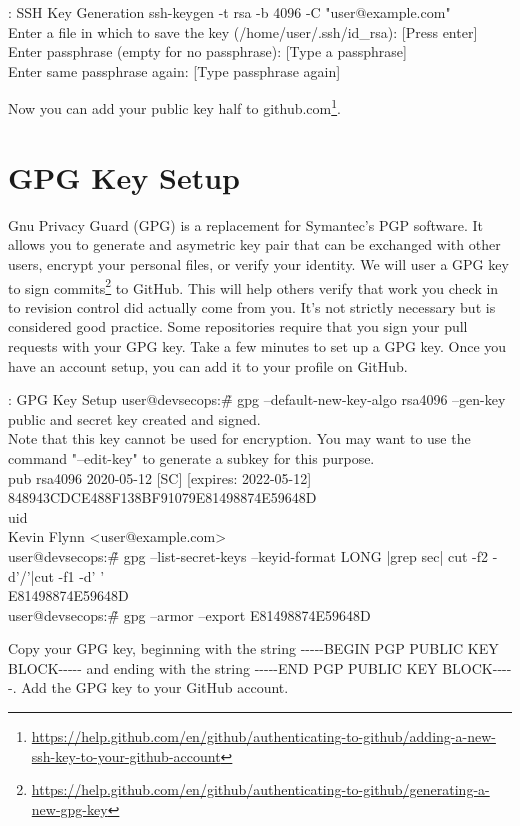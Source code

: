 \begin{mybox}{\thetcbcounter: SSH Key Generation}
	ssh-keygen -t rsa -b 4096 -C "user@example.com"\\
	Enter a file in which to save the key (/home/user/.ssh/id\_rsa): [Press enter]\\
	Enter passphrase (empty for no passphrase): [Type a passphrase]\\
	Enter same passphrase again: [Type passphrase again]
\end{mybox}

\justify
Now you can add your public key half to github.com\footnote{\url{https://help.github.com/en/github/authenticating-to-github/adding-a-new-ssh-key-to-your-github-account}}.

\section{GPG Key Setup}
\justify
Gnu Privacy Guard (GPG) is a replacement for Symantec's PGP software. It allows you
to generate and asymetric key pair that can be exchanged with other users, encrypt your
personal files, or verify your identity. 
\justify
We will user a GPG key to sign commits\footnote{\url{https://help.github.com/en/github/authenticating-to-github/generating-a-new-gpg-key}}
to GitHub. This will help others verify that work you check in to revision control did 
actually come from you. It's not strictly necessary but is considered good practice.
Some repositories require that you sign your pull requests with your GPG key.
\justify
Take a few minutes to set up a GPG key. Once you have an account setup, you can add
it to your profile on GitHub.

\begin{mybox}{\thetcbcounter: GPG Key Setup}
	user@devsecops:\~\# gpg --default-new-key-algo rsa4096 --gen-key\\
	public and secret key created and signed.\\
	Note that this key cannot be used for encryption.  You may want to use
	the command "--edit-key" to generate a subkey for this purpose.\\
	pub   rsa4096 2020-05-12 [SC] [expires: 2022-05-12]\\
	\hspace*{15mm}      848943CDCE488F138BF91079E81498874E59648D\\
	uid\\
	\hspace*{25mm}                     Kevin Flynn <user@example.com>\\
	
	user@devsecops:\~\# gpg --list-secret-keys --keyid-format LONG |grep sec| cut -f2 -d'/'|cut -f1 -d' '\\
	E81498874E59648D\\
	user@devsecops:\~\# gpg --armor --export E81498874E59648D
\end{mybox}
\justify
Copy your GPG key, beginning with the string
-\/-\/-\/-\/-BEGIN PGP PUBLIC KEY BLOCK-\/-\/-\/-\/- and ending with the string
-\/-\/-\/-\/-END PGP PUBLIC KEY BLOCK-\/-\/-\/-\/-. Add the GPG key to
your GitHub account.

